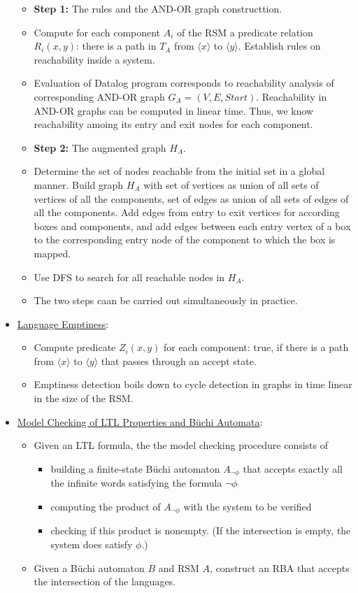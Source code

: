 \documentclass[a4paper,12pt]{article}
\begin{document}
\begin{itemize}
	\begin{itemize}
		\item \textbf{Step 1:} The rules and the AND-OR graph constructtion.
		\item Compute for each component $A_i$ of the RSM a predicate relation $R_i(x,y)$: there is a path in $T_A$ from $\langle x \rangle$ to $\langle y \rangle$. Establish rules on reachability inside a system.
		\item Evaluation of Datalog program corresponds to reachability analysis of corresponding AND-OR graph $G_A=(V,E,Start)$. Reachability in AND-OR graphs can be computed in linear time. Thus, we know reachability amoing its entry and exit nodes for each component.
		\item \textbf{Step 2:} The augmented graph $H_A$.
		\item Determine the set of nodes reachable from the initial set in a global manner. Build graph $H_A$ with set of vertices as union of all sets of vertices of all the components, set of edges as union of all sets of edges of all the components. Add edges from entry to exit vertices for according boxes and components, and add edges between each entry vertex of a box to the corresponding entry node of the component to which the box is mapped.
		\item Use DFS to search for all reachable nodes in $H_A$.
		\item The two steps caan be carried out simultaneously in practice.
	\end{itemize}
	\item \ul{Language Emptiness}:
	\begin{itemize}
		\item Compute predicate $Z_i(x,y)$ for each component: true, if there is a path from $\langle x \rangle$ to $\langle y \rangle$ that passes through an accept state.
		\item Emptiness detection boils down to cycle detection in graphs in time linear in the size of the RSM.
	\end{itemize}
	\item \ul{Model Checking of LTL Properties and B\"uchi Automata}:
	\begin{itemize}
		\item Given an LTL formula, the the model checking procedure consists of 
		\begin{itemize}
			\item building a finite-state B\"uchi automaton $A_{\neg \phi}$ that accepts exactly all the infinite words satisfying the formula $\neg \phi$
			\item computing the product of $A_{\neg \phi}$ with the system to be verified
			\item checking if this product is nonempty. (If the intersection is empty, the system does satisfy $\phi$.)
		\end{itemize}
		\item Given a B\"uchi automaton $B$ and RSM $A$, construct an RBA that accepts the intersection of the languages.
	\end{itemize}
\end{itemize}
\end{document}
